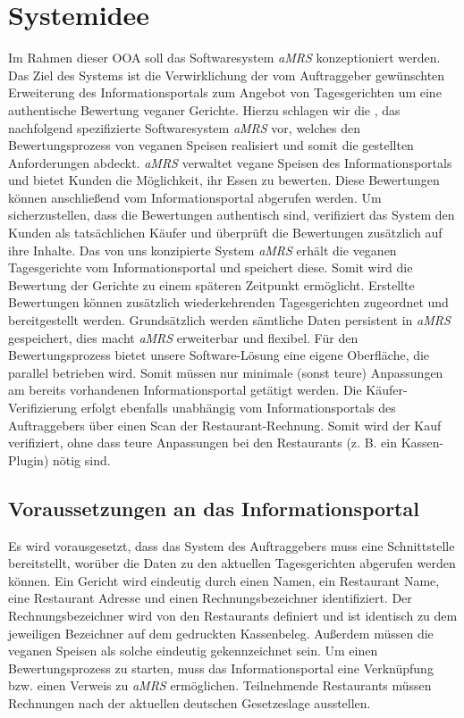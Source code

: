 \section{Systemidee}

Im Rahmen dieser \ac{OOA} soll das Softwaresystem \textit{\ac{aMRS}} konzeptioniert werden.
\newparagraph
Das Ziel des Systems ist die Verwirklichung der vom Auftraggeber gewünschten Erweiterung des Informationsportals zum Angebot von Tagesgerichten um eine authentische Bewertung veganer Gerichte. 
Hierzu schlagen wir die \textit{\vFKW}, das nachfolgend spezifizierte Softwaresystem \textit{\ac{aMRS}} vor, welches den Bewertungsprozess von veganen Speisen realisiert und somit die gestellten Anforderungen abdeckt.
\textit{\ac{aMRS}} verwaltet vegane Speisen des Informationsportals und bietet Kunden die Möglichkeit, ihr Essen zu bewerten.
Diese Bewertungen können anschließend vom Informationsportal abgerufen werden.
Um sicherzustellen, dass die Bewertungen authentisch sind, verifiziert das System den Kunden als tatsächlichen Käufer und überprüft die Bewertungen zusätzlich auf ihre Inhalte.
\newparagraph
Das von uns konzipierte System \textit{\ac{aMRS}} erhält die veganen Tagesgerichte vom Informationsportal und speichert diese.
Somit wird die Bewertung der Gerichte zu einem späteren Zeitpunkt ermöglicht.
Erstellte Bewertungen können zusätzlich wiederkehrenden Tagesgerichten zugeordnet und bereitgestellt werden. Grundsätzlich werden sämtliche Daten persistent in \textit{\ac{aMRS}} gespeichert, dies macht \textit{\ac{aMRS}} erweiterbar und flexibel.
\newparagraph
Für den Bewertungsprozess bietet unsere Software-Lösung eine eigene Oberfläche, die parallel betrieben wird.
Somit müssen nur minimale (sonst teure) Anpassungen am bereits vorhandenen Informationsportal getätigt werden.
Die Käufer-Verifizierung erfolgt ebenfalls unabhängig vom Informationsportals des Auftraggebers über einen Scan der Restaurant-Rechnung.
Somit wird der Kauf verifiziert, ohne dass teure Anpassungen bei den Restaurants (z. B. ein Kassen-Plugin) nötig sind.

\subsection*{Voraussetzungen an das Informationsportal}
Es wird vorausgesetzt, dass das System des Auftraggebers muss eine Schnittstelle bereitstellt, worüber die Daten zu den aktuellen Tagesgerichten abgerufen werden können.
Ein Gericht wird eindeutig durch einen Namen, ein Restaurant Name, eine Restaurant Adresse und einen Rechnungsbezeichner identifiziert.
Der Rechnungsbezeichner wird von den Restaurants definiert und ist identisch zu dem jeweiligen Bezeichner auf dem gedruckten Kassenbeleg.
Außerdem müssen die veganen Speisen als solche eindeutig gekennzeichnet sein.
\newparagraph
Um einen Bewertungsprozess zu starten, muss das Informationsportal eine Verknüpfung bzw. einen Verweis zu \textit{\ac{aMRS}} ermöglichen.
Teilnehmende Restaurants müssen Rechnungen nach der aktuellen deutschen Gesetzeslage ausstellen.


